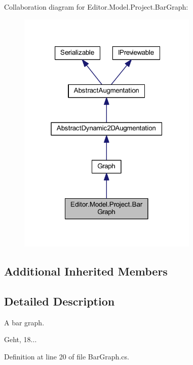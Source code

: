 Collaboration diagram for Editor.\-Model.\-Project.\-Bar\-Graph\-:
\nopagebreak
\begin{figure}[H]
\begin{center}
\leavevmode
\includegraphics[width=244pt]{class_editor_1_1_model_1_1_project_1_1_bar_graph__coll__graph}
\end{center}
\end{figure}
\subsection*{Additional Inherited Members}


\subsection{Detailed Description}
A bar graph. 

Geht, 18... 

Definition at line 20 of file Bar\-Graph.\-cs.

